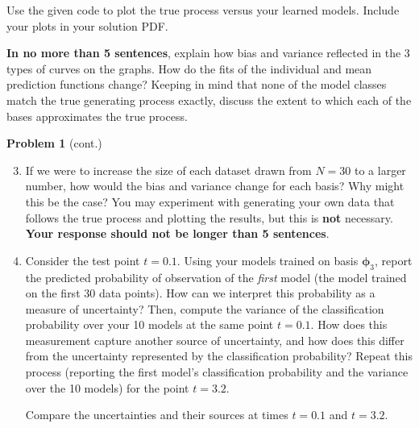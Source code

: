 \documentclass[submit]{harvardml}
\begin{document}
\begin{problem}
\begin{enumerate}
Use the given code to plot the true process versus your learned models. Include your plots in your solution PDF.

\textbf{In no more than 5 sentences}, explain how bias and variance reflected in the 3 types of curves on the graphs.  How do the fits of the individual and mean prediction functions change?  Keeping in mind that none of the model classes match the true generating process exactly, discuss the extent to which each of the bases approximates the true process.

\end{enumerate}
\end{problem}

\newpage
\begin{framed}
\noindent\textbf{Problem 1} (cont.)\\
\begin{enumerate}
\setcounter{enumi}{2}

\item If we were to increase the size of each dataset drawn from $N = 30$ to a larger number, how would the bias and variance change for each basis? Why might this be the case? You may experiment with generating your own data that follows the true process and plotting the results, but this is \textbf{not} necessary. \textbf{Your response should not be longer than 5 sentences}.

\item Consider the test point $t = 0.1$. Using your models trained on basis $\boldsymbol\phi_3$, report the predicted probability of observation of the \textit{first} model (the model trained on the first 30 data points). How can we interpret this probability as a measure of uncertainty? Then, compute the variance of the classification probability over your 10 models at the same point $t = 0.1$. How does this measurement capture another source of uncertainty, and how does this differ from the uncertainty represented by the classification probability? Repeat this process (reporting the first model's classification probability and the variance over the 10 models) for the point $t = 3.2$.

  Compare the uncertainties and their sources at times $t=0.1$ and $t=3.2$.


\end{enumerate}
\end{framed}
\end{document}
